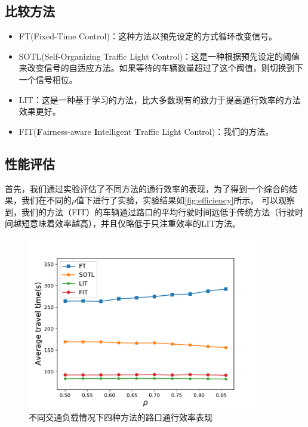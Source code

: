 \subsection{比较方法}
\begin{itemize}
    \item FT(Fixed-Time Control\cite{miller1963settings})：这种方法以预先设定的方式循环改变信号。
    \item SOTL(Self-Organizing Traffic Light Control\cite{cools2013self})：这是一种根据预先设定的阈值来改变信号的自适应方法。如果等待的车辆数量超过了这个阈值，则切换到下一个信号相位。
    \item LIT\cite{zheng2019diagnosing}：这是一种基于学习的方法，比大多数现有的致力于提高通行效率的方法效果更好。
    \item FIT(\textbf{F}airness-aware \textbf{I}ntelligent \textbf{T}raffic Light Control)：我们的方法。
\end{itemize}
\subsection{性能评估}
首先，我们通过实验评估了不同方法的通行效率的表现，为了得到一个综合的结果，我们在不同的$\rho$值下进行了实验，实验结果如\autoref{fig:efficiency}所示。
可以观察到，我们的方法（FIT）的车辆通过路口的平均行驶时间远低于传统方法（行驶时间越短意味着效率越高），并且仅略低于只注重效率的LIT方法。
\begin{figure}[htb]
    \includegraphics[width=0.9\textwidth]{fig/efficiency.pdf}
    \caption{不同交通负载情况下四种方法的路口通行效率表现}
    \label{fig:efficiency}
\end{figure}

